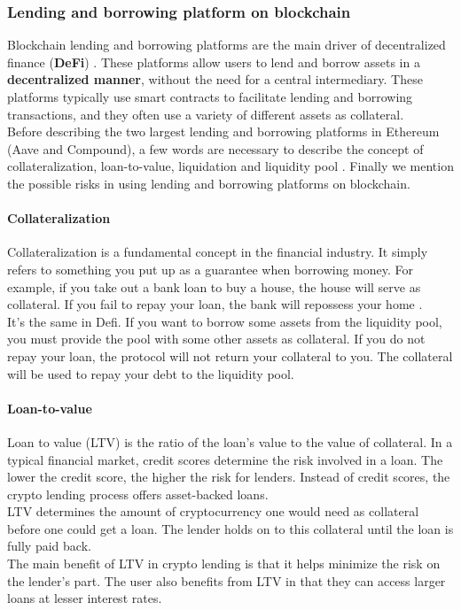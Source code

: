 \subsubsection{Lending and borrowing platform on blockchain}
Blockchain lending and borrowing platforms are the main driver of decentralized finance (\textbf{DeFi}) \cite{defi}. These platforms allow users to lend and borrow assets in a \textbf{decentralized manner}, without the need for a central intermediary. These platforms typically use smart contracts to facilitate lending and borrowing transactions, and they often use a variety of different assets as collateral.
\\
\indent Before describing the two largest lending and borrowing platforms in Ethereum (Aave and Compound), a few words are necessary to describe the concept of collateralization, loan-to-value, liquidation and liquidity pool \cite{defiterm}. Finally we mention the possible risks in using lending and borrowing platforms on blockchain.

\paragraph{Collateralization}
Collateralization is a fundamental concept in the financial industry. It simply refers to something you put up as a guarantee when borrowing money. For example, if you take out a bank loan to buy a house, the house will serve as collateral. If you fail to repay your loan, the bank will repossess your home \cite{collateral}.
\\
\indent It’s the same in Defi. If you want to borrow some assets from the liquidity pool, you must provide the pool with some other assets as collateral. If you do not repay your loan, the protocol will not return your collateral to you. The collateral will be used to repay your debt to the liquidity pool.

\paragraph{Loan-to-value}
Loan to value (LTV) \cite{loantovalue} is the ratio of the loan's value to the value of collateral. In a typical financial market, credit scores determine the risk involved in a loan. The lower the credit score, the higher the risk for lenders. Instead of credit scores, the crypto lending process offers asset-backed loans.
\\
\indent LTV determines the amount of cryptocurrency one would need as collateral before one could get a loan. The lender holds on to this collateral until the loan is fully paid back. 
\\
\indent The main benefit of LTV in crypto lending is that it helps minimize the risk on the lender's part. The user also benefits from LTV in that they can access larger loans at lesser interest rates. 

